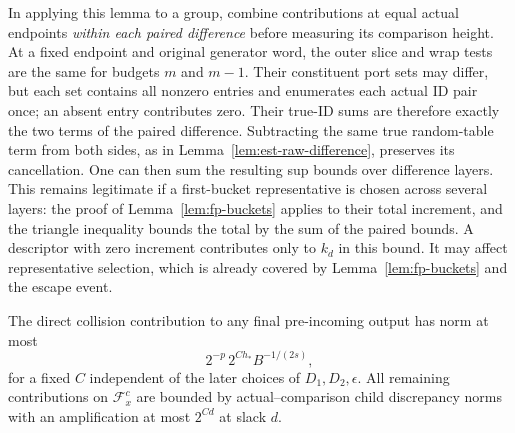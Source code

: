 In applying this lemma to a group, combine contributions at equal actual
endpoints \emph{within each paired difference} before measuring its
comparison height.  At a fixed endpoint and original generator word, the
outer slice and wrap tests are the same for budgets $m$ and $m-1$.
Their constituent port sets may differ, but each set contains all
nonzero entries and enumerates each actual ID pair once; an absent
entry contributes zero.  Their true-ID sums are therefore exactly the
two terms of the paired difference.  Subtracting the same true random-table term from both sides, as in
Lemma~\ref{lem:est-raw-difference}, preserves its cancellation.
One can then sum the resulting sup bounds over difference layers.
This remains legitimate
if a first-bucket representative is chosen across several layers:
the proof of Lemma~\ref{lem:fp-buckets} applies to their total increment,
and the triangle inequality bounds the total by the sum of the paired
bounds.  A descriptor with zero increment contributes only to $k_d$ in
this bound.  It may affect representative selection, which is already
covered by Lemma~\ref{lem:fp-buckets} and the escape event.

\begin{lemma}\label{lem:fp-direct}
The direct collision contribution to any final pre-incoming output has
norm at most
\begin{equation}
             2^{-p}\,2^{C h_*}B^{-1/(2s)},
 \label{eq:fp-direct-charge}
\end{equation}
for a fixed $C$ independent of the later choices of $D_1,D_2,\epsilon$.
All remaining contributions on $\mathcal F_x^c$ are bounded by
actual--comparison child discrepancy norms with an amplification at most
$2^{C d}$ at slack $d$.
\end{lemma}

